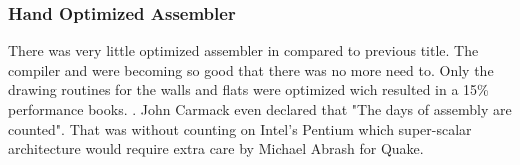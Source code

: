 \par


\subsubsection{Hand Optimized Assembler}
There was very little optimized assembler in \doom compared to previous title. The compiler and  were becoming so good that there was no more need to. Only the drawing routines for the walls and flats were optimized wich resulted in a 15\% performance books. . John Carmack even declared that "The days of assembly are counted". That was without counting on Intel's Pentium which super-scalar architecture would require extra care by Michael Abrash for Quake.
